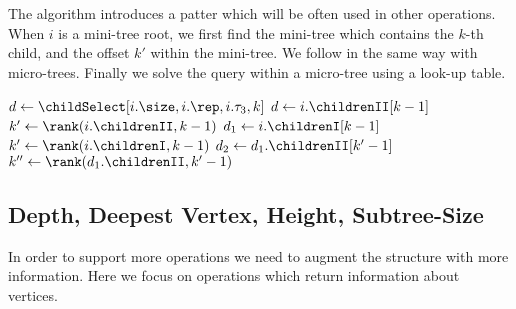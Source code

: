 The algorithm \childSelect{} introduces a patter which will be often used in other operations.
When $i$ is a mini-tree root, we first find the mini-tree which contains the $k$-th child, and the offset $k'$ within the mini-tree.
We follow in the same way with micro-trees.
Finally we solve the query within a micro-tree using a look-up table.

\begin{algorithm}
\begin{algorithmic}
		\State $d \gets \childSelect[i.\size, i.\rep, i.\tau_3, k]$
		\State {}
		\State $d \gets i.\childrenII[k - 1]$
		\State $k' \gets \rank(i.\childrenII, k - 1)$
		 
			\State {}
		\Else {}
			\State {}
		\EndIf
	\Else
		\State $d_1 \gets i.\childrenI[k - 1]$
		\State $k' \gets \rank(i.\childrenI, k - 1)$
		 
			\State $d_2 \gets d_1.\childrenII[k' - 1]$
			\State $k'' \gets \rank(d_1.\childrenII, k' - 1)$
			 
				\State {}
			\Else {}
				\State {}
			\EndIf
		\Else {}
			\State {}
		\EndIf
	\EndIf
\EndFunction
\end{algorithmic}
\end{algorithm}

\subsection{Depth, Deepest Vertex, Height, Subtree-Size}

In order to support more operations we need to augment the structure with more information.
Here we focus on operations which return information about vertices.

